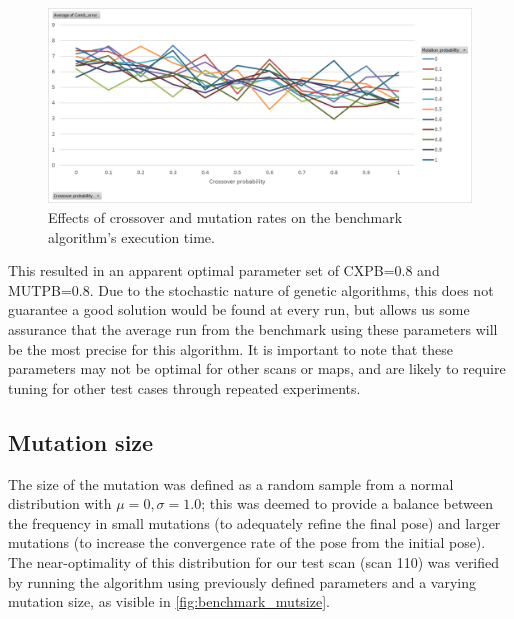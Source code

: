 \documentclass[authoryearcitations]{UoYCSproject}
\begin{document}
\begin{figure}[ht]
\centering
	\includegraphics[width=\textwidth,keepaspectratio]{images/ga_cxpb_mutpb.png}
	\caption[Optimising cross and mutation rate for benchmark algorithm.]{Effects of crossover and mutation rates on the benchmark algorithm's execution time.}
	\label{fig:ga_cxpb_mutpb}
\end{figure}

 This resulted in an apparent optimal parameter set of CXPB=0.8 and MUTPB=0.8. Due to the stochastic nature of genetic algorithms, this does not guarantee a good solution would be found at every run, but allows us some assurance that the average run from the benchmark using these parameters will be the most precise for this algorithm. It is important to note that these parameters may not be optimal for other scans or maps, and are likely to require tuning for other test cases through repeated experiments. 


\subsection{Mutation size}

\datatablebenchmarkmutsize



The size of the mutation was defined as a random sample from a normal distribution with $\mu=0, \sigma=1.0$; this was deemed to provide a balance between the frequency in small mutations (to adequately refine the final pose) and larger mutations (to increase the convergence rate of the pose from the initial pose). The near-optimality of this distribution for our test scan (scan 110) was verified by running the algorithm using previously defined parameters and a varying mutation size, as visible in \autoref{fig:benchmark_mutsize}.
\end{document}
